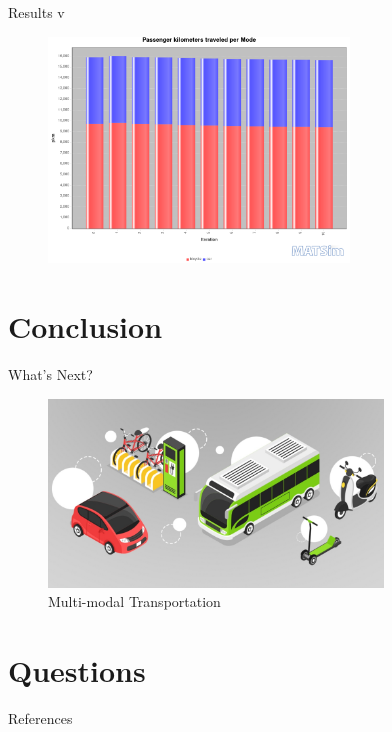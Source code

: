 \documentclass[10pt, aspectratio=169]{beamer}
\begin{document}
    \begin{frame}{Results v}
        \begin{center}
            \begin{figure}
                \centering
                \includegraphics[height=6cm, keepaspectratio]{images/build_city/results/pkm_modestats.png}
            \end{figure}
        \end{center}
    \end{frame}
    
    \section{Conclusion}
    
    \begin{frame}{What's Next?}
        \begin{figure}
            \centering
            \includegraphics[height=5cm, keepaspectratio]{images/multimodaltransport.jpg}
            \caption{Multi-modal Transportation \cite{multimodal}}
        \end{figure}
    \end{frame}
    
    \section{Questions}
    
    \begin{frame}[allowframebreaks]{References}
        
        
    \end{frame}
\end{document}
